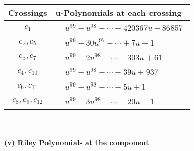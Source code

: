 \documentclass[1p]{elsarticle_modified}
\theoremstyle{definition}
\begin{document}
\begin{tabular}{m{50pt}|m{274pt}}
Crossings & \hspace{64pt}u-Polynomials at each crossing \\
\hline $$\begin{aligned}c_{1}\end{aligned}$$&$\begin{aligned}
&u^{99}- u^{98}+\cdots-420367 u-86857
\end{aligned}$\\
\hline $$\begin{aligned}c_{2},c_{5}\end{aligned}$$&$\begin{aligned}
&u^{99}-30 u^{97}+\cdots+7 u-1
\end{aligned}$\\
\hline $$\begin{aligned}c_{3},c_{7}\end{aligned}$$&$\begin{aligned}
&u^{99}-2 u^{98}+\cdots-303 u+61
\end{aligned}$\\
\hline $$\begin{aligned}c_{4},c_{10}\end{aligned}$$&$\begin{aligned}
&u^{99}- u^{98}+\cdots-39 u+937
\end{aligned}$\\
\hline $$\begin{aligned}c_{6},c_{11}\end{aligned}$$&$\begin{aligned}
&u^{99}+u^{98}+\cdots-5 u+1
\end{aligned}$\\
\hline $$\begin{aligned}c_{8},c_{9},c_{12}\end{aligned}$$&$\begin{aligned}
&u^{99}-3 u^{98}+\cdots-20 u-1
\end{aligned}$\\
\hline
\end{tabular}\\~\\
\newpage\renewcommand{\arraystretch}{1}
\flushleft \textbf{(v) Riley Polynomials at the component}\newline \\
\end{document}
